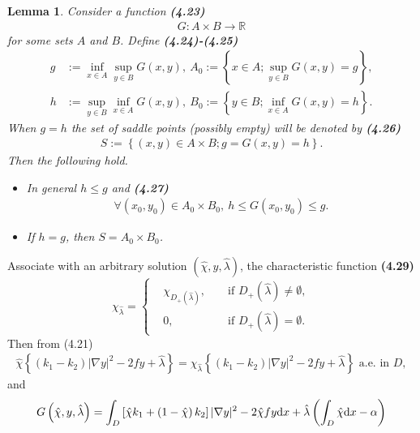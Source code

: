 \documentclass{book}
\numberwithin{equation}{section}
\newtheorem{lemma}{Lemma}[section]
\begin{document}
\begin{enumerate}
    \begin{lemma}
        Consider a function \textbf{(4.23)}
        \begin{align*}
            G:A\times B\to\mathbb{R}
        \end{align*}
        for some sets $A$ and $B$. Define \textbf{(4.24)-(4.25)}
        \begin{align*}
            g &:= \inf_{x\in A}\sup_{y\in B} G(x,y),\ A_0 := \left\{x\in A;\sup_{y\in B} G(x,y) = g\right\},\\
            h &:= \sup_{y\in B}\inf_{x\in A} G(x,y),\ B_0 := \left\{y\in B;\inf_{x\in A} G(x,y) = h\right\}.
        \end{align*}
        When $g = h$ the set of saddle points (possibly empty) will be denoted by \textbf{(4.26)}
        \begin{align*}
            S := \left\{(x,y)\in A\times B;g = G(x,y) = h\right\}.
        \end{align*}
        Then the following hold.
        \begin{itemize}
            \item[(i)] In general $h\le g$ and \textbf{(4.27)}
            \begin{align*}
                \forall(x_0,y_0)\in A_0\times B_0,\ h\le G(x_0,y_0)\le g.
            \end{align*}
            \item[(ii)] If $h = g$, then $S = A_0\times B_0$.
        \end{itemize}
    \end{lemma}
    Associate with an arbitrary solution $(\hat{\chi},y,\hat{\lambda})$, the characteristic function \textbf{(4.29)}
    \begin{equation*}
        \chi_{\hat{\lambda}} = \left\{\begin{split}
            &\chi_{D_+(\hat{\lambda})},&&\mbox{ if } D_+(\hat{\lambda})\ne\emptyset,\\
            &0,&&\mbox{ if } D_+(\hat{\lambda}) = \emptyset.
        \end{split}\right.
    \end{equation*}
    Then from (4.21)
    \begin{align*}
        \hat{\chi}\left\{(k_1 - k_2)|\nabla y|^2 - 2fy + \hat{\lambda}\right\} = \chi_{\hat{\lambda}}\left\{(k_1 - k_2)|\nabla y|^2 - 2fy + \hat{\lambda}\right\} \mbox{ a.e. in } D,
    \end{align*}
    and
    \begin{align*}
        G\left(\hat{\chi},y,\hat{\lambda}\right) &= \int_D \left[\hat{\chi}k_1 + \left(1 - \hat{\chi}\right)k_2\right]|\nabla y|^2 - 2\hat{\chi}fy{\rm d}x + \hat{\lambda}\left(\int_D \hat{\chi}{\rm d}x - \alpha\right)\\

\end{align*}
\end{enumerate}
\end{document}
